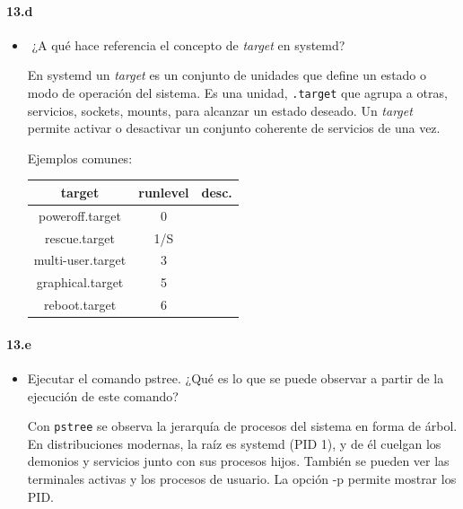 \documentclass[10pt,a4paper]{paper}
\begin{document}
\paragraph{13.d}
\begin{itemize}
	
	\item​ ¿A qué hace referencia el concepto de \textit{target} en systemd?
	
	En systemd un \textit{target} es un conjunto de unidades que define un estado o modo de operación del sistema. Es una unidad, \texttt{.target} que agrupa a otras, servicios, sockets, mounts, para alcanzar un estado deseado. Un \textit{target} permite activar o desactivar un conjunto coherente de servicios de una vez.
	
	Ejemplos comunes:
	
	\begin{center}
		\begin{tabular}{||c c c ||} 
			\hline
			
			target & runlevel & desc.\\ [0.5ex] 
			
			\hline\hline
			poweroff.target & 0 &  \\ 
			\hline
			
			rescue.target & 1/S &   \\
			
			\hline
			
			multi-user.target & 3 &  \\
			
			\hline
			
			graphical.target & 5 &  \\
			\hline
			reboot.target & 6 &  \\ [1ex] 
			\hline
		\end{tabular}
	\end{center}
	
	
\end{itemize}


\paragraph{13.e}
\begin{itemize}
	
	\item ​Ejecutar el comando pstree. ¿Qué es lo que se puede observar a partir de la ejecución de este comando?
	
	
	Con \texttt{pstree} se observa la jerarquía de procesos del sistema en forma de árbol. En distribuciones modernas, la raíz es systemd (PID 1), y de él cuelgan los demonios y servicios junto con sus procesos hijos. También se pueden ver las terminales activas y los procesos de usuario. La opción -p permite mostrar los PID.
	
\end{itemize}
\end{document}
